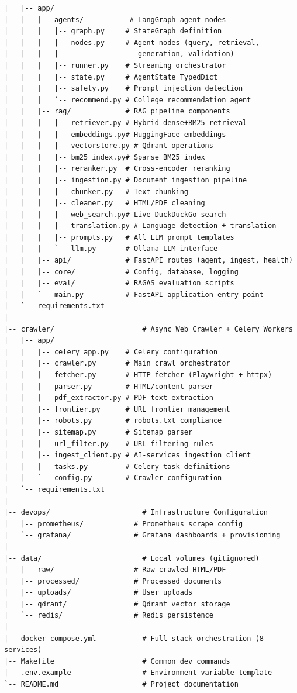 \begin{verbatim}
|   |-- app/
|   |   |-- agents/           # LangGraph agent nodes
|   |   |   |-- graph.py     # StateGraph definition
|   |   |   |-- nodes.py     # Agent nodes (query, retrieval,
|   |   |   |                   generation, validation)
|   |   |   |-- runner.py    # Streaming orchestrator
|   |   |   |-- state.py     # AgentState TypedDict
|   |   |   |-- safety.py    # Prompt injection detection
|   |   |   `-- recommend.py # College recommendation agent
|   |   |-- rag/             # RAG pipeline components
|   |   |   |-- retriever.py # Hybrid dense+BM25 retrieval
|   |   |   |-- embeddings.py# HuggingFace embeddings
|   |   |   |-- vectorstore.py # Qdrant operations
|   |   |   |-- bm25_index.py# Sparse BM25 index
|   |   |   |-- reranker.py  # Cross-encoder reranking
|   |   |   |-- ingestion.py # Document ingestion pipeline
|   |   |   |-- chunker.py   # Text chunking
|   |   |   |-- cleaner.py   # HTML/PDF cleaning
|   |   |   |-- web_search.py# Live DuckDuckGo search
|   |   |   |-- translation.py # Language detection + translation
|   |   |   |-- prompts.py   # All LLM prompt templates
|   |   |   `-- llm.py       # Ollama LLM interface
|   |   |-- api/             # FastAPI routes (agent, ingest, health)
|   |   |-- core/            # Config, database, logging
|   |   |-- eval/            # RAGAS evaluation scripts
|   |   `-- main.py          # FastAPI application entry point
|   `-- requirements.txt
|
|-- crawler/                     # Async Web Crawler + Celery Workers
|   |-- app/
|   |   |-- celery_app.py    # Celery configuration
|   |   |-- crawler.py       # Main crawl orchestrator
|   |   |-- fetcher.py       # HTTP fetcher (Playwright + httpx)
|   |   |-- parser.py        # HTML/content parser
|   |   |-- pdf_extractor.py # PDF text extraction
|   |   |-- frontier.py      # URL frontier management
|   |   |-- robots.py        # robots.txt compliance
|   |   |-- sitemap.py       # Sitemap parser
|   |   |-- url_filter.py    # URL filtering rules
|   |   |-- ingest_client.py # AI-services ingestion client
|   |   |-- tasks.py         # Celery task definitions
|   |   `-- config.py        # Crawler configuration
|   `-- requirements.txt
|
|-- devops/                      # Infrastructure Configuration
|   |-- prometheus/            # Prometheus scrape config
|   `-- grafana/               # Grafana dashboards + provisioning
|
|-- data/                        # Local volumes (gitignored)
|   |-- raw/                   # Raw crawled HTML/PDF
|   |-- processed/             # Processed documents
|   |-- uploads/               # User uploads
|   |-- qdrant/                # Qdrant vector storage
|   `-- redis/                 # Redis persistence
|
|-- docker-compose.yml           # Full stack orchestration (8 services)
|-- Makefile                     # Common dev commands
|-- .env.example                 # Environment variable template
`-- README.md                    # Project documentation
\end{verbatim}

